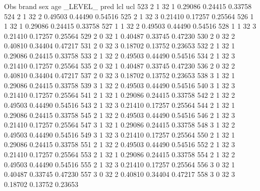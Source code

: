 \documentclass{article}
\begin{document}
\begin{Woutput}
 Obs    brand    sex    age    _LEVEL_      pred       lcl        ucl
 523      2       1      32       1       0.29086    0.24415    0.33758
 524      2       1      32       2       0.49503    0.44490    0.54516
 525      2       1      32       3       0.21410    0.17257    0.25564
 526      1       1      32       1       0.29086    0.24415    0.33758
 527      1       1      32       2       0.49503    0.44490    0.54516
 528      1       1      32       3       0.21410    0.17257    0.25564
 529      2       0      32       1       0.40487    0.33745    0.47230
 530      2       0      32       2       0.40810    0.34404    0.47217
 531      2       0      32       3       0.18702    0.13752    0.23653
 532      2       1      32       1       0.29086    0.24415    0.33758
 533      2       1      32       2       0.49503    0.44490    0.54516
 534      2       1      32       3       0.21410    0.17257    0.25564
 535      2       0      32       1       0.40487    0.33745    0.47230
 536      2       0      32       2       0.40810    0.34404    0.47217
 537      2       0      32       3       0.18702    0.13752    0.23653
 538      3       1      32       1       0.29086    0.24415    0.33758
 539      3       1      32       2       0.49503    0.44490    0.54516
 540      3       1      32       3       0.21410    0.17257    0.25564
 541      2       1      32       1       0.29086    0.24415    0.33758
 542      2       1      32       2       0.49503    0.44490    0.54516
 543      2       1      32       3       0.21410    0.17257    0.25564
 544      2       1      32       1       0.29086    0.24415    0.33758
 545      2       1      32       2       0.49503    0.44490    0.54516
 546      2       1      32       3       0.21410    0.17257    0.25564
 547      3       1      32       1       0.29086    0.24415    0.33758
 548      3       1      32       2       0.49503    0.44490    0.54516
 549      3       1      32       3       0.21410    0.17257    0.25564
 550      2       1      32       1       0.29086    0.24415    0.33758
 551      2       1      32       2       0.49503    0.44490    0.54516
 552      2       1      32       3       0.21410    0.17257    0.25564
 553      2       1      32       1       0.29086    0.24415    0.33758
 554      2       1      32       2       0.49503    0.44490    0.54516
 555      2       1      32       3       0.21410    0.17257    0.25564
 556      3       0      32       1       0.40487    0.33745    0.47230
 557      3       0      32       2       0.40810    0.34404    0.47217
 558      3       0      32       3       0.18702    0.13752    0.23653

\end{Woutput}
\end{document}
